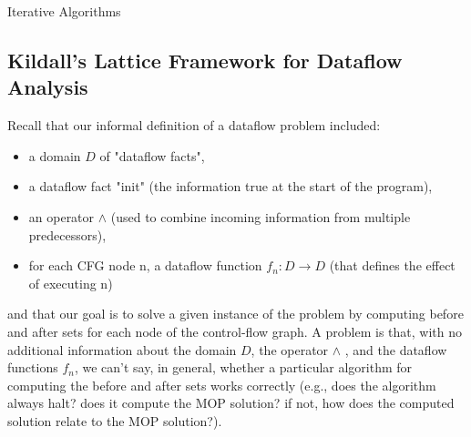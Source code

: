 \begin{algorithm}
	\caption{Iterative Algorithms}\label{alg:Iterative Algorithms}
	\begin{algorithmic}
		\EndIf
		\EndWhile
	\end{algorithmic}
\end{algorithm}


\subsection{Kildall's Lattice Framework for Dataflow Analysis}


Recall that our informal definition of a dataflow problem included:
\begin{itemize}
	\item a domain $D$ of "dataflow facts",
	\item a dataflow fact "init" (the information true at the start
	      of the program),
	\item an operator $\wedge$ (used to combine incoming information from multiple predecessors),
	\item for each CFG node n, a dataflow function
	      $f_n : D \rightarrow D$ (that defines the effect of executing n)

\end{itemize}

and that our goal is to solve a given instance of the problem by computing
	{\color{red} before} and {\color{red} after} sets for each node of the control-flow graph.
A problem is that, with no additional information about the domain $D$,
the operator $\wedge$ , and the dataflow functions $f_n$, we can't say,
in general, whether a particular algorithm for computing the before
and after sets works correctly (e.g., does the algorithm always halt?
does it compute the MOP solution? if not, how does the computed solution
relate to the MOP solution?).



